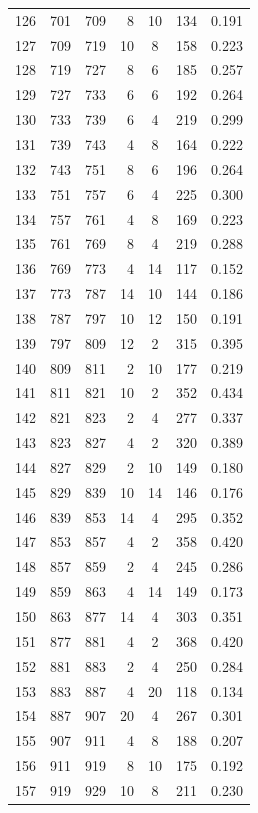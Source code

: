 \documentclass[12pt]{article}
\theoremstyle{plain}
\theoremstyle{definition}
\theoremstyle{remark}
\begin{document}
\begin{center}
\begin{small}
\begin{longtable}{@{}crrrccc@{}}
126 & 701 & 709 & 8 & 10 & 134 & 0.191 \\
127 & 709 & 719 & 10 & 8 & 158 & 0.223 \\
128 & 719 & 727 & 8 & 6 & 185 & 0.257 \\
129 & 727 & 733 & 6 & 6 & 192 & 0.264 \\
130 & 733 & 739 & 6 & 4 & 219 & 0.299 \\
131 & 739 & 743 & 4 & 8 & 164 & 0.222 \\
132 & 743 & 751 & 8 & 6 & 196 & 0.264 \\
133 & 751 & 757 & 6 & 4 & 225 & 0.300 \\
134 & 757 & 761 & 4 & 8 & 169 & 0.223 \\
135 & 761 & 769 & 8 & 4 & 219 & 0.288 \\
136 & 769 & 773 & 4 & 14 & 117 & 0.152 \\
137 & 773 & 787 & 14 & 10 & 144 & 0.186 \\
138 & 787 & 797 & 10 & 12 & 150 & 0.191 \\
139 & 797 & 809 & 12 & 2 & 315 & 0.395 \\
140 & 809 & 811 & 2 & 10 & 177 & 0.219 \\
141 & 811 & 821 & 10 & 2 & 352 & 0.434 \\
142 & 821 & 823 & 2 & 4 & 277 & 0.337 \\
143 & 823 & 827 & 4 & 2 & 320 & 0.389 \\
144 & 827 & 829 & 2 & 10 & 149 & 0.180 \\
145 & 829 & 839 & 10 & 14 & 146 & 0.176 \\
146 & 839 & 853 & 14 & 4 & 295 & 0.352 \\
147 & 853 & 857 & 4 & 2 & 358 & 0.420 \\
148 & 857 & 859 & 2 & 4 & 245 & 0.286 \\
149 & 859 & 863 & 4 & 14 & 149 & 0.173 \\
150 & 863 & 877 & 14 & 4 & 303 & 0.351 \\
151 & 877 & 881 & 4 & 2 & 368 & 0.420 \\
152 & 881 & 883 & 2 & 4 & 250 & 0.284 \\
153 & 883 & 887 & 4 & 20 & 118 & 0.134 \\
154 & 887 & 907 & 20 & 4 & 267 & 0.301 \\
155 & 907 & 911 & 4 & 8 & 188 & 0.207 \\
156 & 911 & 919 & 8 & 10 & 175 & 0.192 \\
157 & 919 & 929 & 10 & 8 & 211 & 0.230 \\

\end{longtable}
\end{small}
\end{center}
\end{document}
